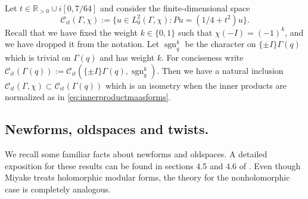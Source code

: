 \documentclass{article}
\theoremstyle{named}
\newcommand{\C}{\mathcal{C}}
\newcommand{\R}{\mathbb{R}}
\DeclareMathOperator{\sgn}{sgn}
\begin{document}
Let $t \in \R_{> 0} \cup i[0, 7/64]$ and consider the finite-dimensional space 
\begin{equation}\label{eq:cuspidalspacefixedspectraldata}
    \C_{it}(\Gamma, \chi) := \{u \in L_0^2(\Gamma, \chi) : Pu = (1/4 + t^2)u\}.
\end{equation}
Recall that we have fixed the weight $k \in \{0, 1\}$ such that $\chi(-I) = (-1)^k$, and we have dropped it from the notation. Let $\sgn_q^k$ be the character on $\{\pm I\}\Gamma(q)$ which is trivial on $\Gamma(q)$ and has weight $k$. For conciseness write $\C_{it}(\Gamma(q)) := \C_{it}(\{\pm I\}\Gamma(q), \sgn_q^k)$. Then we have a natural inclusion $\C_{it}(\Gamma, \chi) \subset \C_{it}(\Gamma(q))$ which is an isometry when the inner products are normalized as in \eqref{eq:innerproductmaasforms}.

\subsection{Newforms, oldspaces and twists.}
We recall some familiar facts about newforms and oldspaces. A detailed exposition for these results can be found in sections 4.5 and 4.6 of \cite{miyake}. Even though Miyake treats holomorphic modular forms, the theory for the nonholomorphic case is completely analogous.
\end{document}

